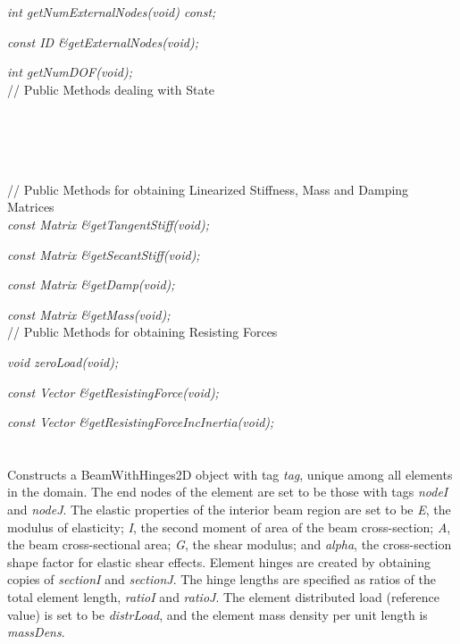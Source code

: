{\em int getNumExternalNodes(void) const;} 

{\em const ID \&getExternalNodes(void);} 

{\em int getNumDOF(void);}\\ 

// Public Methods dealing with State

 \\
 \\ 
 \\ \\
\indent // Public Methods for obtaining Linearized Stiffness,
Mass and Damping Matrices\\
{\em const Matrix \&getTangentStiff(void);} 

{\em const Matrix \&getSecantStiff(void);} 

{\em const Matrix \&getDamp(void);} 

{\em const Matrix \&getMass(void);} \\ 

// Public Methods for obtaining Resisting Forces 

{\em void zeroLoad(void);	}

{\em const Vector \&getResistingForce(void);} 

{\em const Vector \&getResistingForceIncInertia(void);} \\ 


  \\
  \\
Constructs a BeamWithHinges2D object with tag {\em tag}, unique among all elements
in the domain.  The end nodes of the element are set to be those with tags 
{\em nodeI} and {\em nodeJ}.  The elastic properties of the interior beam region
are set to be {\em E}, the modulus of elasticity; {\em I}, the second moment of
area of the beam cross-section; {\em A}, the beam cross-sectional area; {\em G},
the shear modulus; and {\em alpha}, the cross-section shape factor for elastic shear 
effects.  Element hinges are created by obtaining copies of {\em sectionI} and {\em sectionJ}.
The hinge lengths are specified as ratios of the total element length, {\em ratioI}
and {\em ratioJ}.  The element distributed load (reference value) is set to be {\em distrLoad},
and the element mass density per unit length is {\em massDens}. \\

